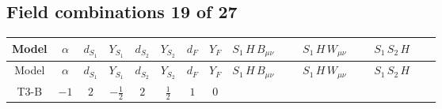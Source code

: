 \documentclass[8pt]{article}
\begin{document}
\begin{landscape}
\subsection*{Field combinations 19 of 27}
\begin{longtable}{@{}cccccccc >{\raggedright\arraybackslash}p{0.21\linewidth} >{\raggedright\arraybackslash}p{0.21\linewidth} >{\raggedright\arraybackslash}p{0.21\linewidth}@{}}
\toprule
Model & $\alpha$ & $d_{S_1}$ & $Y_{S_1}$ & $d_{S_2}$ & $Y_{S_2}$ & $d_F$ & $Y_F$ & $S_1\,H\,B_{\mu\nu}$ & $S_1\,H\,W_{\mu\nu}$ & $S_1\,S_2\,H$ \\
\midrule
\endfirsthead
\toprule
Model & $\alpha$ & $d_{S_1}$ & $Y_{S_1}$ & $d_{S_2}$ & $Y_{S_2}$ & $d_F$ & $Y_F$ & $S_1\,H\,B_{\mu\nu}$ & $S_1\,H\,W_{\mu\nu}$ & $S_1\,S_2\,H$ \\
\midrule
\endhead
T3-B & $-1$ & $2$ & $-\frac{1}{2}$ & $2$ & $\frac{1}{2}$ & $1$ & $0$ & \scriptsize\adjustbox{max width=\linewidth}{$\begin{gathered} -\frac{\hbar  B_{\mu _1\mu _2}^2 H_{a_1} H_{a_1}{}^{\dagger } \lambda_{HS_1}^{(1)}^{(1)}}{48 m_1^2} \\ -\frac{\hbar  B_{\mu _1\mu _2}^2 H_{a_1} H_{a_1}{}^{\dagger } \lambda_{HS_1}^{(1)}^{(2)}}{16 \sqrt{3} m_1^2}\end{gathered}$} & \scriptsize\adjustbox{max width=\linewidth}{$\begin{gathered} -\frac{\hbar  H_{a_1} \left(W_{\mu _1\mu _2}^{A_1}\right){}^2 H_{a_1}{}^{\dagger } \lambda_{HS_1}^{(1)}^{(1)}}{48 m_1^2} \\ -\frac{\hbar  H_{a_1} \left(W_{\mu _1\mu _2}^{A_1}\right){}^2 H_{a_1}{}^{\dagger } \lambda_{HS_1}^{(1)}^{(2)}}{16 \sqrt{3} m_1^2}\end{gathered}$} & \scriptsize\adjustbox{max width=\linewidth}{$\begin{gathered} +\frac{\hbar  H_{a_1} H_{a_3} S_{2,j_2} \mathcal{I}_{y_1,a_2,j_2} {\mathcal{C}_{LS_1F}}^{*}_{a_3,j_1} H_{a_1}{}^{\dagger } H_{a_2}{}^{\dagger } S_{2,j_1}{}^{\dagger } \lambda_{12}^{(1)}^{(1)} \left(\lambda_{HS_1}^{(1)}^{(1)}\right){}^2}{2 m_1^2} \\ +\frac{\hbar  H_{a_1} H_{a_2} S_{2,j_1} H_{a_1}{}^{\dagger } H_{a_2}{}^{\dagger } S_{2,j_1}{}^{\dagger } \lambda_{12}^{(1)}^{(2)} \left(\lambda_{HS_1}^{(1)}^{(1)}\right){}^2}{\sqrt{3} m_1^2} \\ -\frac{\hbar  H_{a_1} H_{a_3} S_{2,j_2} \mathcal{I}_{y_1,a_2,j_2} {\mathcal{C}_{LS_1F}}^{*}_{a_3,j_1} H_{a_1}{}^{\dagger } H_{a_2}{}^{\dagger } S_{2,j_1}{}^{\dagger } \lambda_{12}^{(1)}^{(2)} \left(\lambda_{HS_1}^{(1)}^{(1)}\right){}^2}{2 \sqrt{3} m_1^2}\end{gathered}$} \\

\end{longtable}
\end{landscape}
\end{document}
